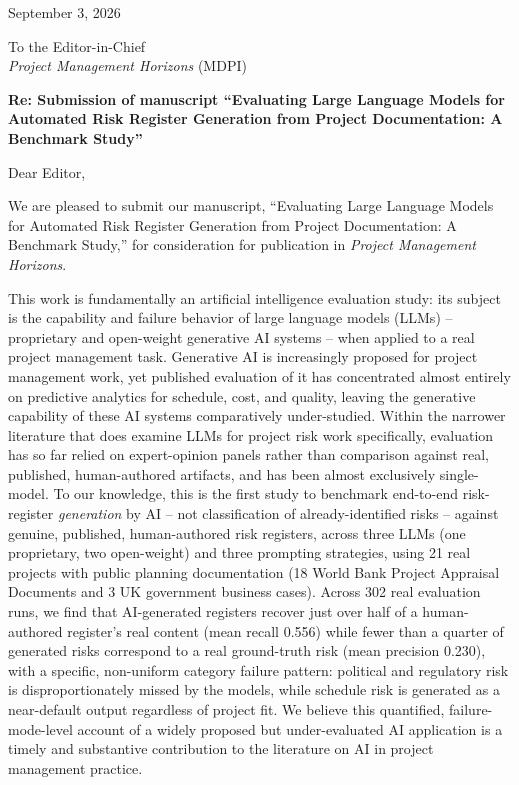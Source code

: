 \documentclass[11pt]{article}
\begin{document}
\begin{flushright}
September 3, 2026
\end{flushright}

To the Editor-in-Chief\\
\textit{Project Management Horizons} (MDPI)

\bigskip
\noindent\textbf{Re: Submission of manuscript ``Evaluating Large Language Models for Automated Risk Register Generation from Project Documentation: A Benchmark Study''}

\bigskip
Dear Editor,

We are pleased to submit our manuscript, ``Evaluating Large Language Models for Automated Risk Register Generation from Project Documentation: A Benchmark Study,'' for consideration for publication in \textit{Project Management Horizons}.

This work is fundamentally an artificial intelligence evaluation study: its subject is the capability and failure behavior of large language models (LLMs) -- proprietary and open-weight generative AI systems -- when applied to a real project management task. Generative AI is increasingly proposed for project management work, yet published evaluation of it has concentrated almost entirely on predictive analytics for schedule, cost, and quality, leaving the generative capability of these AI systems comparatively under-studied. Within the narrower literature that does examine LLMs for project risk work specifically, evaluation has so far relied on expert-opinion panels rather than comparison against real, published, human-authored artifacts, and has been almost exclusively single-model. To our knowledge, this is the first study to benchmark end-to-end risk-register \emph{generation} by AI -- not classification of already-identified risks -- against genuine, published, human-authored risk registers, across three LLMs (one proprietary, two open-weight) and three prompting strategies, using 21 real projects with public planning documentation (18 World Bank Project Appraisal Documents and 3 UK government business cases). Across 302 real evaluation runs, we find that AI-generated registers recover just over half of a human-authored register's real content (mean recall 0.556) while fewer than a quarter of generated risks correspond to a real ground-truth risk (mean precision 0.230), with a specific, non-uniform category failure pattern: political and regulatory risk is disproportionately missed by the models, while schedule risk is generated as a near-default output regardless of project fit. We believe this quantified, failure-mode-level account of a widely proposed but under-evaluated AI application is a timely and substantive contribution to the literature on AI in project management practice.
\end{document}
